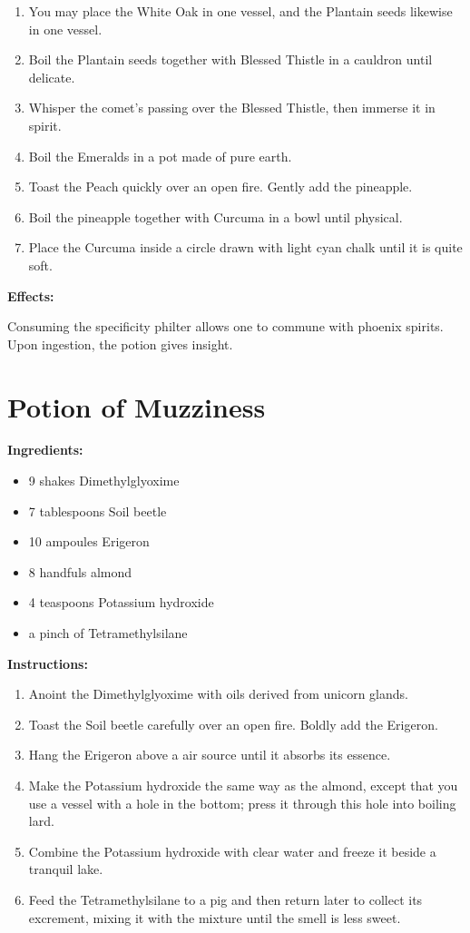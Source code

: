 \documentclass{article}
\begin{document}
\begin{enumerate}
  \item You may place the White Oak in one vessel, and the Plantain seeds likewise in one vessel.
  \item Boil the Plantain seeds together with Blessed Thistle in a cauldron until delicate.
  \item Whisper the comet’s passing over the Blessed Thistle, then immerse it in spirit.
  \item Boil the Emeralds in a pot made of pure earth.
  \item Toast the Peach quickly over an open fire. Gently add the pineapple.
  \item Boil the pineapple together with Curcuma in a bowl until physical.
  \item Place the Curcuma inside a circle drawn with light cyan chalk until it is quite soft.
\end{enumerate}

\textbf{Effects:}

Consuming the specificity philter allows one to commune with phoenix spirits. Upon ingestion, the potion gives insight.

\newpage
\section*{Potion of Muzziness}

\textbf{Ingredients:}

\begin{itemize}
  \item 9 shakes Dimethylglyoxime
  \item 7 tablespoons Soil beetle
  \item 10 ampoules Erigeron
  \item 8 handfuls almond
  \item 4 teaspoons Potassium hydroxide
  \item a pinch of Tetramethylsilane
\end{itemize}

\textbf{Instructions:}

\begin{enumerate}
  \item Anoint the Dimethylglyoxime with oils derived from unicorn glands.
  \item Toast the Soil beetle carefully over an open fire. Boldly add the Erigeron.
  \item Hang the Erigeron above a air source until it absorbs its essence.
  \item Make the Potassium hydroxide the same way as the almond, except that you use a vessel with a hole in the bottom; press it through this hole into boiling lard.
  \item Combine the Potassium hydroxide with clear water and freeze it beside a tranquil lake.
  \item Feed the Tetramethylsilane to a pig and then return later to collect its excrement, mixing it with the mixture until the smell is less sweet.
\end{enumerate}
\end{document}
